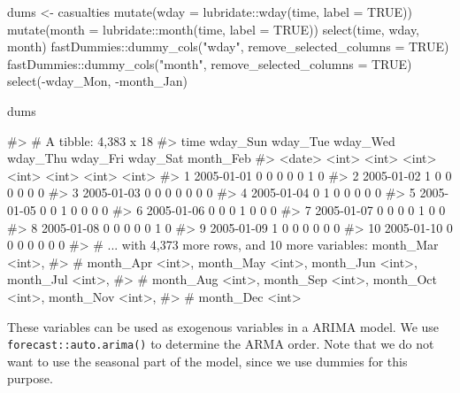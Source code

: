 \begin{Schunk}
\begin{Sinput}
dums <-
  casualties %
  mutate(wday = lubridate::wday(time, label = TRUE)) %
  mutate(month = lubridate::month(time, label = TRUE)) %
  select(time, wday, month) %
  fastDummies::dummy_cols("wday", remove_selected_columns = TRUE) %
  fastDummies::dummy_cols("month", remove_selected_columns = TRUE) %
  select(-wday_Mon, -month_Jan)

dums
\end{Sinput}
\begin{Soutput}
#> # A tibble: 4,383 x 18
#>    time       wday_Sun wday_Tue wday_Wed wday_Thu wday_Fri wday_Sat month_Feb
#>    <date>        <int>    <int>    <int>    <int>    <int>    <int>     <int>
#>  1 2005-01-01        0        0        0        0        0        1         0
#>  2 2005-01-02        1        0        0        0        0        0         0
#>  3 2005-01-03        0        0        0        0        0        0         0
#>  4 2005-01-04        0        1        0        0        0        0         0
#>  5 2005-01-05        0        0        1        0        0        0         0
#>  6 2005-01-06        0        0        0        1        0        0         0
#>  7 2005-01-07        0        0        0        0        1        0         0
#>  8 2005-01-08        0        0        0        0        0        1         0
#>  9 2005-01-09        1        0        0        0        0        0         0
#> 10 2005-01-10        0        0        0        0        0        0         0
#> # ... with 4,373 more rows, and 10 more variables: month_Mar <int>,
#> #   month_Apr <int>, month_May <int>, month_Jun <int>, month_Jul <int>,
#> #   month_Aug <int>, month_Sep <int>, month_Oct <int>, month_Nov <int>,
#> #   month_Dec <int>
\end{Soutput}
\end{Schunk}

These variables can be used as exogenous variables in a ARIMA model. We
use \texttt{forecast::auto.arima()} to determine the ARMA order. Note
that we do not want to use the seasonal part of the model, since we use
dummies for this purpose.

